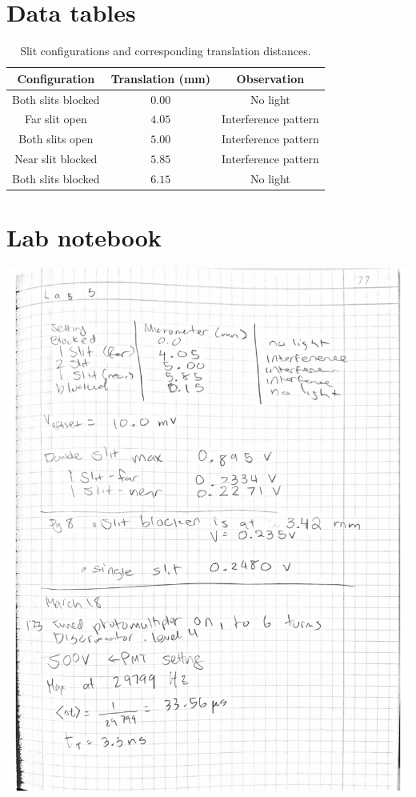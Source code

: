 \documentclass[notitlepage]{report}
\begin{document}
	\pagebreak
	\section*{Data tables}
	\begin{table}[H]
		\centering
		\caption{Slit configurations and corresponding translation distances.}
		\label{table:translations}
		\begin{tabular}{ccc}
			\toprule
			Configuration & Translation (mm) & Observation \\
			\midrule
			Both slits blocked & $0.00$ & No light \\
			Far slit open & $4.05$ & Interference pattern \\
			Both slits open & $5.00$ & Interference pattern \\
			Near slit blocked & $5.85$ & Interference pattern \\
			Both slits blocked & $6.15$ & No light \\
			\bottomrule
		\end{tabular}
	\end{table}

	\section*{Lab notebook}
	\begin{center}
		\includegraphics[width=\linewidth]{Scanned_20210401-1937}
	\end{center}
	
\end{document}
